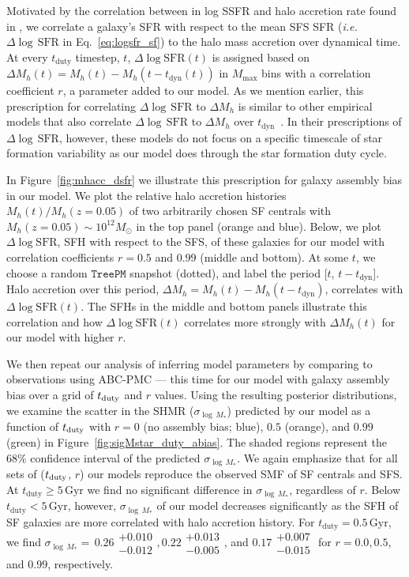 \documentclass[12pt, letterpaper, preprint, tighten]{aastex62}
\newcommand{\logsfr}{\log\mathrm{SFR}}
\begin{document}
Motivated by the correlation between in log SSFR and halo accretion rate found 
in \cite{tinker2018}, we correlate a galaxy's SFR with respect to the mean SFS 
SFR (\emph{i.e.} $\Delta\log\,\mathrm{SFR}$ in Eq.~\ref{eq:logsfr_sf}) to the 
halo mass accretion over dynamical time. At every $t_\mathrm{duty}$ timestep, 
$t$, $\Delta\logsfr(t)$ is assigned based on 
$\Delta M_h(t) = M_h(t) - M_h(t - t_\mathrm{dyn}(t))$ in $M_\mathrm{max}$ bins 
with a correlation coefficient $r$, a parameter added to our model. As we mention
earlier, this prescription for correlating $\Delta\log\,\mathrm{SFR}$ to 
$\Delta M_h$ is similar to other empirical models that  also correlate 
$\Delta\log\,\mathrm{SFR}$ to $\Delta M_h$ over $t_\mathrm{dyn}$~\citep{watson2015, rodriguez-puebla2016a, behroozi2018}.
In their prescriptions of $\Delta\log\,\mathrm{SFR}$, however, these models 
do not focus on a specific timescale of star formation variability as our model 
does through the star formation duty cycle. 

In Figure~\ref{fig:mhacc_dsfr} we illustrate this prescription for galaxy
assembly bias in our model. We plot the relative halo accretion histories 
$M_h(t)/M_h(z{=}0.05)$ of two arbitrarily chosen SF centrals with 
$M_h(z{=}0.05)\sim10^{12}M_\odot$ in the top panel (orange and blue). Below, we plot 
$\Delta\logsfr$, SFH with respect to the SFS, of these galaxies for our model with 
correlation coefficients $r=0.5$ and $0.99$ (middle and bottom). At some $t$, we 
choose a random $\mathtt{TreePM}$ snapshot (dotted), and label the period 
[$t$, $t - t_\mathrm{dyn}$]. Halo accretion over this period, 
$\Delta M_h = M_h(t) - M_h(t-t_\mathrm{dyn})$, correlates with $\Delta\logsfr(t)$. 
The SFHs in the middle and bottom panels illustrate this correlation and how 
$\Delta\logsfr(t)$ correlates more strongly with $\Delta M_h(t)$ for our model 
with higher $r$. 

We then repeat our analysis of inferring model parameters by comparing to  
observations using ABC-PMC --- this time for our model with galaxy assembly 
bias over a grid of $t_{\rm duty}$ and $r$ values. Using the resulting 
posterior distributions, we examine the scatter in the SHMR ($\sigma_{\log\,M_*}$) 
predicted by our model as a function of $t_{\rm duty}$ with $r=0$ (no 
assembly bias; blue), $0.5$ (orange), and $0.99$ (green) in Figure~\ref{fig:sigMstar_duty_abias}. 
The shaded regions represent the $68\%$ confidence interval of the predicted 
$\sigma_{\log\,M_*}$. We again emphasize that for all sets of ($t_{\rm duty}$, $r$) 
our models reproduce the observed SMF of SF centrals and SFS.  
At $t_\mathrm{duty} \geq 5\,\mathrm{Gyr}$ we find no significant difference 
in $\sigma_{\log\,M_*}$, regardless of $r$. Below $t_\mathrm{duty} < 5\,\mathrm{Gyr}$, 
however, $\sigma_{\log\,M_*}$ of our model decreases significantly as the SFH 
of SF galaxies are more correlated with halo accretion history.
For $t_\mathrm{duty} = 0.5\,\mathrm{Gyr}$, 
{\color{red}
we find $\sigma_{\log\,M_*}{=}\,0.26\substack{+0.010\\-0.012}, 
0.22\substack{+0.013\\-0.005}$, and $0.17\substack{+0.007\\-0.015} $ 
}
for $r = 0.0, 0.5$, and $0.99$, respectively. 
\end{document}
